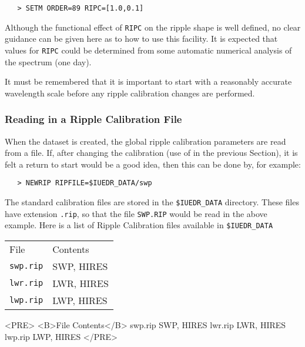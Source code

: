 \begin{verbatim}
   > SETM ORDER=89 RIPC=[1.0,0.1]
\end{verbatim}

Although the functional effect of \verb+RIPC+ on the ripple shape is well
defined, no clear guidance can be given here as to how to use this facility.
It is expected that values for \verb+RIPC+ could be determined from some
automatic numerical analysis of the spectrum (one day)\@.

It must be remembered that it is important to start with a reasonably
accurate wavelength scale before any ripple calibration changes are
performed.

\subsubsection{Reading in a Ripple Calibration File}

When the dataset is created, the global ripple calibration parameters are read
from a file.  If, after changing the calibration (use of
 in the
previous Section), it is felt a return to start would be a good idea, then
this can be done by, for example:

\begin{verbatim}
   > NEWRIP RIPFILE=$IUEDR_DATA/swp
\end{verbatim}

The standard calibration files are stored in the \verb+$IUEDR_DATA+
directory.  These files have extension \verb+.rip+, so that the file
\verb+SWP.RIP+ would be read in the above example.  Here is a list
of Ripple Calibration files available in \verb+$IUEDR_DATA+

\begin{latexonly}
\begin{tabular}{ll}
File          & Contents\\
{\tt swp.rip} & SWP, HIRES\\
{\tt lwr.rip} & LWR, HIRES\\
{\tt lwp.rip} & LWP, HIRES\\
\end{tabular}
\end{latexonly}

\begin{htmlonly}
\begin{rawhtml}
<PRE>
<B>File       Contents</B>
swp.rip    SWP, HIRES
lwr.rip    LWR, HIRES
lwp.rip    LWP, HIRES
</PRE>
\end{rawhtml}
\end{htmlonly}

